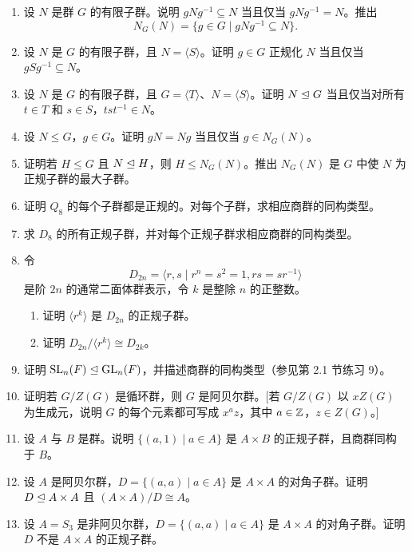 \begin{enumerate}[label=\arabic*.]
\begin{enumerate}[label=(\alph*)]
    \item 推出若 $N=\langle x\rangle$ 是循环群，则 $N$ 在 $G$ 中正规，当且仅当对每个 $g\in G$，$gxg^{-1}=x^k$ 对某个 $k\in\ZZ$ 成立。
    \item 设 $n$ 是正整数。证明由 $G$ 中所有阶为 $n$ 的元素生成的子群 $N$ 是 $G$ 的正规子群。
  \end{enumerate}
  \item 设 $N$ 是群 $G$ 的有限子群。说明 $gNg^{-1}\subseteq N$ 当且仅当 $gNg^{-1}=N$。推出
  \[
    N_G(N)=\{g\in G\mid gNg^{-1}\subseteq N\}.
  \]
  \item 设 $N$ 是 $G$ 的有限子群，且 $N=\langle S\rangle$。证明 $g\in G$ 正规化 $N$ 当且仅当 $gSg^{-1}\subseteq N$。
  \item 设 $N$ 是 $G$ 的有限子群，且 $G=\langle T\rangle$、$N=\langle S\rangle$。证明 $N\trianglelefteq G$ 当且仅当对所有 $t\in T$ 和 $s\in S$，$tst^{-1}\in N$。
  \item 设 $N\leq G$，$g\in G$。证明 $gN=Ng$ 当且仅当 $g\in N_G(N)$。
  \item 证明若 $H\leq G$ 且 $N\trianglelefteq H$，则 $H\leq N_G(N)$。推出 $N_G(N)$ 是 $G$ 中使 $N$ 为正规子群的最大子群。
  \item 证明 $Q_8$ 的每个子群都是正规的。对每个子群，求相应商群的同构类型。
  \item 求 $D_8$ 的所有正规子群，并对每个正规子群求相应商群的同构类型。
  \item 令
  \[
    D_{2n}=\langle r,s\mid r^n=s^2=1,rs=sr^{-1}\rangle
  \]
  是阶 $2n$ 的通常二面体群表示，令 $k$ 是整除 $n$ 的正整数。
  \begin{enumerate}[label=(\alph*)]
    \item 证明 $\langle r^k\rangle$ 是 $D_{2n}$ 的正规子群。
    \item 证明 $D_{2n}/\langle r^k\rangle\cong D_{2k}$。
  \end{enumerate}
  \item 证明 $\operatorname{SL}_n(F)\trianglelefteq\operatorname{GL}_n(F)$，并描述商群的同构类型（参见第 2.1 节练习 9）。
  \item 证明若 $G/Z(G)$ 是循环群，则 $G$ 是阿贝尔群。[若 $G/Z(G)$ 以 $xZ(G)$ 为生成元，说明 $G$ 的每个元素都可写成 $x^az$，其中 $a\in\mathbb{Z}$，$z\in Z(G)$。]
  \item 设 $A$ 与 $B$ 是群。说明 $\{(a,1)\mid a\in A\}$ 是 $A\times B$ 的正规子群，且商群同构于 $B$。
  \item 设 $A$ 是阿贝尔群，$D=\{(a,a)\mid a\in A\}$ 是 $A\times A$ 的对角子群。证明 $D\trianglelefteq A\times A$ 且 $(A\times A)/D\cong A$。
  \item 设 $A=S_3$ 是非阿贝尔群，$D=\{(a,a)\mid a\in A\}$ 是 $A\times A$ 的对角子群。证明 $D$ 不是 $A\times A$ 的正规子群。

\end{enumerate}

